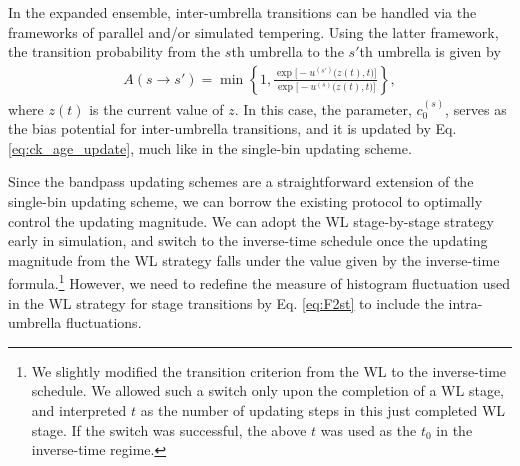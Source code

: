\documentclass[reprint, superscriptaddress, floatfix]{revtex4-1}
\begin{document}
In the expanded ensemble,
inter-umbrella transitions can be handled via the frameworks of
parallel\cite{swendsen1986,
  *geyer1991, *hukushima1996, *hansmann1997, *sugita1999,
  *earl2005, *zuckerman2011, *rauscher2009,
  neuhaus2006, *neuhaus2007, kim2010}
and/or simulated tempering\cite{marinari1992,
  *lyubartsev1992, li2007,
  park2007, *nguyen2013, *zhang2015st}.
%
Using the latter framework,
the transition probability from
the $s$th umbrella to the $s'$th umbrella is given by
%
\begin{align}
A(s \to s') =
\min\left\{1,
  \frac{
    \exp\bigl[ - u^{(s')}\bigl( z(t), t \bigr) \bigr]
  }
  {
    \exp\bigl[ - u^{(s)}\bigl( z(t), t \bigr) \bigr]
  }
  \right\}
  ,
  \label{eq:transprob_st}
\end{align}
where $z(t)$ is the current value of $z$.
%
In this case,
the parameter, $c_0^{(s)}$,
serves as the bias potential
for inter-umbrella transitions,
and it is updated by Eq. \eqref{eq:ck_age_update},
much like in the single-bin updating scheme.\cite{li2007}

Since the bandpass updating schemes are a straightforward extension
of the single-bin updating scheme,
we can borrow the existing protocol\cite{belardinelli2007,
  *belardinelli2007jcp, *belardinelli2008, *belardinelli2016}
to optimally control the updating magnitude.
%
We can adopt the WL stage-by-stage strategy early in simulation,
and switch to the inverse-time schedule
once the updating magnitude from the WL strategy
falls under the value given by the inverse-time formula.\footnote{We
  slightly modified the transition criterion
  from the WL to the inverse-time schedule.
  We allowed such a switch only
  upon the completion of a WL stage,
  and interpreted $t$ as the number of updating steps
  in this just completed WL stage.
  If the switch was successful,
  the above $t$ was used as the $t_0$
  in the inverse-time regime.}
However, we need to redefine the measure of histogram fluctuation
used in the WL strategy for stage transitions
by Eq. \eqref{eq:F2st}
to include the intra-umbrella fluctuations.
%
\end{document}
